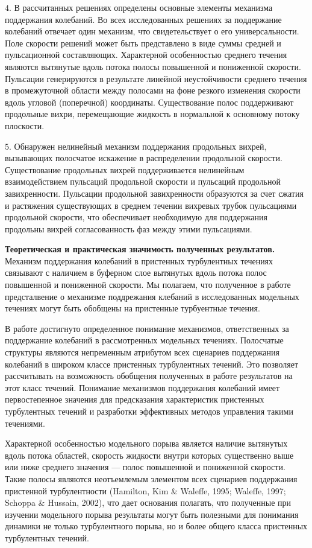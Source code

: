 \noindent $4.$  В рассчитанных решениях определены основные элементы механизма поддержания колебаний. Во всех исследованных решениях за поддержание колебаний отвечает один механизм, что свидетельствует о его универсальности. 
Поле скорости решений может быть представлено в виде суммы средней и пульсационной составляющих. Характерной особенностью среднего течения являются вытянутые вдоль потока полосы повышенной и пониженной скорости. Пульсации генерируются в результате линейной неустойчивости среднего течения в промежуточной области между полосами на фоне резкого изменения скорости вдоль угловой (поперечной) координаты. Существование полос поддерживают продольные вихри, перемещающие жидкость в нормальной к основному потоку плоскости.

\noindent $5.$  Обнаружен нелинейный механизм поддержания продольных вихрей, вызывающих полосчатое искажение в распределении продольной скорости. Существование продольных вихрей поддерживается нелинейным взаимодействием пульсаций продольной скорости и пульсаций продольной завихренности. Пульсации продольной завихренности образуются за счет сжатия и растяжения существующих в среднем течении вихревых трубок пульсациями продольной скорости, что обеспечивает необходимую для поддержания продольны вихрей согласованность фаз между этими пульсациями. 

{\bf Теоретическая и практическая значимость полученных результатов.}
Механизм поддержания колебаний в пристенных турбулентных течениях связывают с наличием в буферном слое вытянутых вдоль потока полос повышенной и пониженной скорости. Мы полагаем, что полученное в работе предсталвение о механизме поддрежания клебаний в исследованных модельных течениях могут быть обобщены на пристенные турбуентные течения. 

В работе достигнуто определенное понимание механизмов, ответственных за поддержание колебаний в рассмотренных модельных течениях. Полосчатые структуры являются непременным атрибутом всех сценариев поддержания колебаний в широком классе пристенных турбулентных течений. Это позволяет рассчитывать на возможность обобщения полученных в работе результатов на этот класс течений. Понимание механизмов поддержания колебаний имеет первостепенное значения для предсказания характеристик пристенных турбулентных течений и разработки эффективных методов управления такими течениями.


Характерной особенностью модельного порыва является наличие вытянутых вдоль потока областей, скорость жидкости внутри которых существенно выше или ниже среднего значения --- полос повышенной и пониженной скорости. Такие полосы являются неотъемлемым элементом всех сценариев поддержания пристенной турбулентности (Hamilton, Kim \& Waleffe, 1995; Waleffe, 1997; Schoppa \& Hussain, 2002), что дает основания полагать, что полученные при изучении модельного порыва результаты могут быть полезными для понимания динамики не только турбулентного порыва, но и более общего класса пристенных турбулентных течений. 

